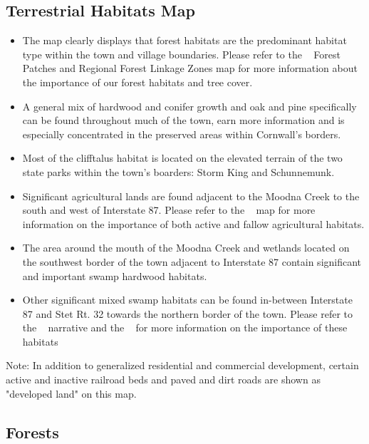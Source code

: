 \label{map:terrestrialhabitats}
\subsection*{Terrestrial Habitats Map}\label{subsec:terrestrialhabitatsmap}
\begin{itemize}
    \item The map clearly displays that forest habitats are the predominant
    habitat type within the town and village boundaries. Please refer to the
~ Forest Patches and Regional Forest Linkage Zones map for more information about
the importance of our forest habitats and tree cover.
    \item A general mix of hardwood and conifer growth and oak and pine specifically can be found
        throughout much of the town, earn more information and is especially
        concentrated in the preserved areas within Cornwall’s borders.
    \item Most of the cliff\/talus habitat is located on the elevated terrain of 
         the two state parks within the town’s boarders: Storm King and Schunnemunk.
    \item Significant agricultural lands are found adjacent to the Moodna Creek to 
        the south and west of Interstate 87. Please refer to the ~ map for more information on the importance
        of both active and fallow agricultural habitats.
    \item The area around the mouth of the Moodna Creek and wetlands located on
        the southwest border of the town adjacent to Interstate 87 contain
        significant and important swamp hardwood habitats.  
    \item Other significant
       mixed swamp habitats can be found in-between Interstate 87 and Stet Rt. 32
        towards the northern border of the town. Please refer to the ~
        narrative and the ~ for more
        information on the importance of these habitats
\end{itemize}
Note: In addition to generalized residential and commercial development, 
certain active and inactive railroad beds and paved and dirt roads are shown
as "developed land" on this map.

\subsection{Forests}\label{subsec:forests}

